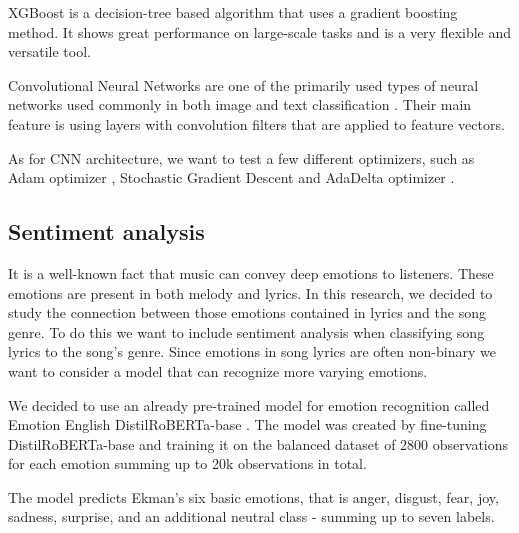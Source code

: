XGBoost \cite{xgboostRef} is a decision-tree based algorithm that uses a gradient boosting method. It shows great performance on large-scale tasks and is a very flexible and versatile tool.

Convolutional Neural Networks are one of the primarily used types of neural networks used commonly in both image and text classification \cite{cnnRef}. Their main feature is using layers with convolution filters that are applied to feature vectors.

As for CNN architecture, we want to test a few different optimizers, such as Adam optimizer \cite{adamRef}, Stochastic Gradient Descent and AdaDelta optimizer \cite{adadeltaRef}.


\subsection{Sentiment analysis}

It is a well-known fact that music can convey deep emotions to listeners. These emotions are present in both melody and lyrics. In this research, we decided to study the connection between those emotions contained in lyrics and the song genre. To do this we want to include sentiment analysis when classifying song lyrics to the song's genre. Since emotions in song lyrics are often non-binary we want to consider a model that can recognize more varying emotions.

We decided to use an already pre-trained model for emotion recognition called Emotion English DistilRoBERTa-base \cite{hartmann2022emotionenglish}.
The model was created by fine-tuning DistilRoBERTa-base and training it on the balanced dataset of $2800$ observations for each emotion summing up to 20k observations in total.



The model predicts Ekman's six basic emotions, that is anger, disgust, fear, joy, sadness, surprise, and an additional neutral class - summing up to seven labels.

